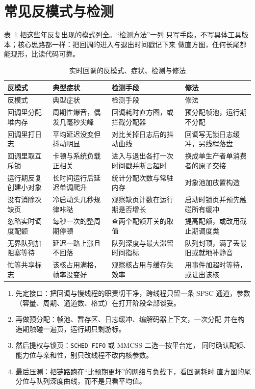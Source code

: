 \documentclass[12pt,a4paper,fontset=fandol]{ctexbook}
\newcommand{\Tp}[1]{\texttt{#1}}
\begin{document}
\section{常见反模式与检测}

表~\ref{tab:ch12-antipattern} 把这些年反复出现的模式列全。``检测方法''一列
只写手段，不写具体工具版本；核心思路都一样：把回调的进入与退出时间戳记下来
做直方图，任何长尾都能现形，比读代码可靠。

\begin{longtable}{>{\raggedright\arraybackslash}p{}
                 >{\raggedright\arraybackslash}p{}
                 >{\raggedright\arraybackslash}p{}
                 >{\raggedright\arraybackslash}p{}}
\caption{实时回调的反模式、症状、检测与修法}\label{tab:ch12-antipattern} \\
\toprule
反模式 & 典型症状 & 检测手段 & 修法 \\ \midrule
\endfirsthead
\toprule
反模式 & 典型症状 & 检测手段 & 修法 \\ \midrule
\endhead
\bottomrule
\endfoot
回调里分配堆内存 & 周期性爆音，偶发几毫秒尖峰 & 回调耗时直方图，或拦截分配器 & 预分配帧池，运行期不分配 \\
回调里打日志 & 平均延迟没变但抖动明显 & 对比关掉日志后的抖动曲线 & 回调写无锁日志缓冲，另线程落盘 \\
回调里取互斥锁 & 卡顿与系统负载正相关 & 进入与退出各打一次时间戳并断言超时 & 换成单生产者单消费者的原子交接 \\
运行期反复创建小对象 & 长时间运行后延迟单调爬升 & 统计分配次数与常驻内存 & 对象池加放置构造 \\
没有消除次缺页 & 冷启动头几秒规律咔哒 & 观察缺页计数在运行期是否增长 & 启动时锁页并预先触碰所有缓冲 \\
忽略实时调度配额 & 每秒一次的整周期停顿 & 查两个配额开关的取值 & 提高配额，或改用截止期调度类 \\
无界队列加阻塞等待 & 延迟一路上涨且不回落 & 队列深度与最大滞留时间指标 & 队列封顶，满了丢最旧或就地补静音 \\
忙等共享标志 & 该核占用满格，帧率没变好 & 观察核占用与缓存失效率 & 用事件加超时等待，或让出该核 \\
\end{longtable}

\begin{bestpractice}[title={实时侧的落地顺序}]
\begin{enumerate}
  \item 先定接口：把回调与慢线程的职责切干净，跨线程只留一条 SPSC
        通道，参数（容量、周期、通道数、格式）在打开阶段全部谈妥。
  \item 再做预分配：帧池、暂存区、日志缓冲、编解码器上下文，一次分配
        并在构造期触碰一遍页，运行期只剩游标。
  \item 然后提权与锁页：\Tp{SCHED\_FIFO} 或 MMCSS 二选一按平台定，
        同时确认配额、能力位与亲和性，别只改线程不改内核参数。
  \item 最后压测：把链路跑在``比预期更坏''的网络与负载下，看回调耗时
        直方图的尾分位与队列深度曲线，而不是只看平均值。
\end{enumerate}
\end{bestpractice}
\end{document}
